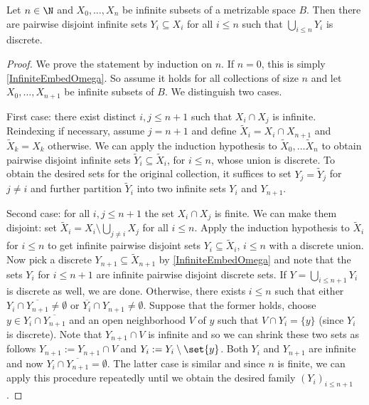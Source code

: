 \begin{lemma}\label{InfiniteEmbedOmegaStronger}
Let $n\in \N$ and $X_0,\ldots, X_n$ be infinite subsets of a metrizable space $B$.
Then there are pairwise disjoint infinite sets $Y_i\subseteq X_i$ for all $i\leq n$ such that $\bigcup_{i\leq n} Y_i$ is discrete.
\end{lemma}
\begin{proof}
We prove the statement by induction on $n$. If $n=0$, this is simply \cref{InfiniteEmbedOmega}.
So assume it holds for all collections of size $n$ and let $X_0,\ldots, X_{n+1}$ be infinite subsets of $B$. We distinguish two cases.

First case: there exist distinct $i,j\leq n+1$ such that $X_{i}\cap X_{j}$ is infinite.
Reindexing if necessary, assume $j=n+1$ and define $\tilde{X}_{i}=X_{i}\cap X_{n+1}$ and $\tilde{X}_{k}=X_k$ otherwise.
We can apply the induction hypothesis to $\tilde{X}_0,\ldots \tilde{X}_n$ to obtain pairwise disjoint infinite sets $\tilde{Y}_i\subseteq \tilde{X}_{i}$, for $i\leq n$, whose union is discrete.
To obtain the desired sets for the original collection, it suffices to set $Y_j=\tilde{Y}_j$ for $j\neq i$ and further partition $\tilde{Y}_{i}$ into two infinite sets $Y_i$ and $Y_{n+1}$.

Second case: for all $i,j\leq n+1$ the set $X_i\cap X_j$ is finite. We can make them disjoint: set $\tilde{X}_i=X_i\setminus\bigcup_{j\neq i}X_j$ for all $i \leq n$. 
Apply the induction hypothesis to $\tilde{X}_i$ for $i\leq n$ to get infinite pairwise disjoint sets $Y_i\subseteq \tilde{X}_i$, $i\leq n$ with a discrete union.
Now pick a discrete $Y_{n+1}\subseteq \tilde{X}_{n+1}$ by \cref{InfiniteEmbedOmega} and note that the sets $Y_i$ for $i\leq n+1$ are infinite pairwise disjoint discrete sets. 
If $Y=\bigcup_{i\leq n+1} Y_i$ is discrete as well, we are done.
Otherwise, there exists $i\leq n$ such that either $Y_i\cap \overline{Y_{n+1}}\neq \emptyset$ or $\overline{Y_i}\cap Y_{n+1}\neq \emptyset$.  
Suppose that the former holds, choose $y\in Y_i\cap \overline{Y_{n+1}}$ and an open neighborhood $V$ of $y$ such that $V\cap Y_i= \{y\}$ (since $Y_i$ is discrete).
Note that $Y_{n+1}\cap V$ is infinite and so we can shrink these two sets as follows $Y_{n+1}:=Y_{n+1}\cap V$ and $Y_i:=Y_i\setminus \set{y}$.
Both $Y_i$ and $Y_{n+1}$ are infinite and now $Y_i\cap \overline{Y_{n+1}}=\emptyset$.
The latter case is similar and since $n$ is finite, we can apply this procedure repeatedly until we obtain the desired family $(Y_i)_{i\leq n+1}$.
\end{proof}


